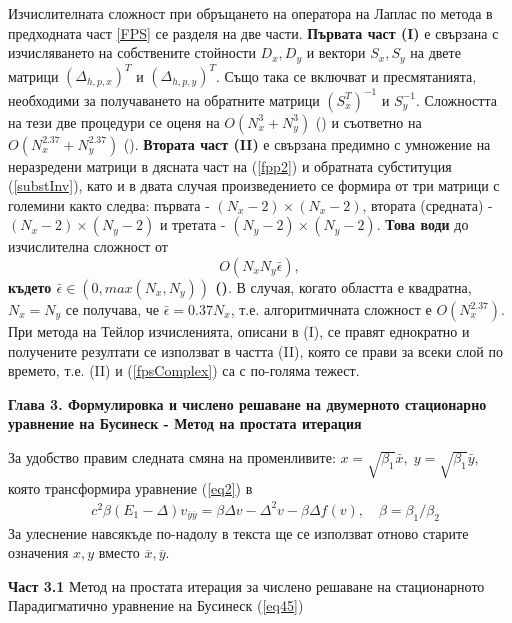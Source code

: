 \documentclass[a5paper]{article}
\newcommand{\be}{\begin{equation}}
\newcommand{\ee}{\end{equation}}
\newcommand{\rf}[1]{(\ref{#1})}
\theoremstyle{remark}
\begin{document}
\begin{large}
Изчислителната сложност при обръщането на оператора на Лаплас по метода в предходната част \ref{FPS} се разделя на две части. \textbf{ Първата част (I)} е свързана с изчисляването на собствените стойности $D_x, D_y$ и вектори $S_x, S_y$ на двете матрици $(\Delta_{h,p,x})^T$ и $(\Delta_{h,p,y})^T$. Също така се включват и пресмятанията, необходими за получаването на обратните матрици $(S_x^T)^{-1}$ и $S_y^{-1}$. Сложността на тези две процедури се оценя на $O(N_x^3+N_y^3)$ (\cite{ref260}) и съответно на $O(N_x^{2.37}+N_y^{2.37})$ (\cite{ref27}). \textbf{Втората част (II)} е свързана предимно с умножение на неразредени матрици в дясната част на \rf{fpp2} и обратната субституция \rf{substInv}, като и в двата случая произведението се формира от три матрици  с големини както следва: първата - $(N_x-2) \times (N_x-2)$, втората (средната) - $(N_x-2) \times (N_y-2)$ и третата - $(N_y-2) \times (N_y-2)$. \textbf{Това води} до изчислителна сложност от
\be\label{fpsComplex}
O(N_x N_y \bar{\epsilon}),
\ee
\textbf{където $\bar{\epsilon} \in (0, max(N_x, N_y))$ (\cite{ref26, ref27})}. В случая, когато областта е квадратна, $N_x = N_y$ се получава, че $\bar{\epsilon} = 0.37 N_x$, т.е. алгоритмичната сложност е $O(N_x^{2.37})$. При метода на Тейлор изчисленията, описани в (I), се правят еднократно и получените резултати се използват в частта (II), която се прави за всеки слой по времето, т.е. (II) и \rf{fpsComplex} са с по-голяма тежест. 
\fi

\newpage
\textbf{Глава 3. Формулировка и числено решаване на двумерното стационарно уравнение на Бусинеск - Метод на простата итерация}

За удобство правим следната смяна на променливите: $x = \sqrt{\beta_1} \bar{x}, \; y = \sqrt{\beta_1} \bar{y}$, която трансформира уравнение \rf{eq2} в 
\begin{align}\label{eq3}
&c^2 \beta (E_1- \Delta) v_{{\overline y}{\overline y}} = \beta \Delta v - \Delta^2 v - \beta \Delta f(v), \quad \beta = \beta_1/\beta_2
\end{align}
За улеснение навсякъде по-надолу в текста ще се използват отново старите означения $x,y$ вместо ${\overline x},{\overline y}$.

\textbf{Част 3.1} Метод на простата итерация за числено решаване на стационарното Парадигматично уравнение на Бусинеск \rf{eq45}


\end{large}
\end{document}
